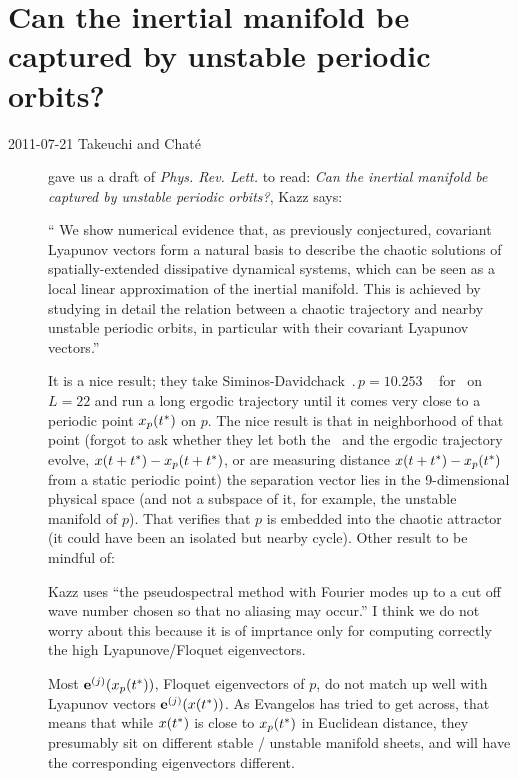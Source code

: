 \RemarksEnd

\section{Can the inertial manifold be captured by unstable periodic orbits?}
\label{sec:TaCh11}

\begin{description}

\item[2011-07-21 Takeuchi and Chat\'e]
gave us a draft of \emph{Phys. Rev. Lett.} to read:
\emph{Can the inertial manifold be captured by unstable periodic orbits?},
Kazz says:

`` We show numerical evidence that, as previously conjectured,
covariant Lyapunov vectors form a natural basis to describe the
chaotic solutions of spatially-extended dissipative dynamical
systems, which can be seen as a local linear approximation of the
inertial manifold. This is achieved by studying in detail the
relation between a chaotic trajectory and nearby unstable periodic
orbits, in particular with their covariant Lyapunov vectors.''

It is a nice result; they take Siminos-Davidchack $\period{p} = 10.253$
\po\  for \KS\ on $L = 22$ and run a long ergodic trajectory until it
comes very close to a periodic point $\ssp_p(t^*) $ on $p$. The nice
result is that in neighborhood of that point (forgot to ask whether they
let both the \po\ and the ergodic trajectory evolve, $\ssp(t+t^*) -
\ssp_p(t+t^*)$, or are measuring distance $\ssp(t+t^*) - \ssp_p(t^*)$ from a
static periodic point) the separation vector lies in the 9-dimensional
physical space (and not a subspace of it, for example, the unstable
manifold of $p$). That verifies that $p$ is embedded into the chaotic
attractor (it could have been an isolated but nearby cycle).
Other result to be mindful of:

Kazz uses ``the pseudospectral method with Fourier modes up to a cut off
wave number chosen so that no aliasing may occur.'' I think we do not
worry about this because it is of imprtance only for computing correctly
the high Lyapunove/Floquet eigenvectors.

Most $\jEigvec[j](\ssp_p(t^*))$, Floquet eigenvectors of $p$, do not match
up well with Lyapunov vectors $\jEigvec[j](\ssp(t^*))$. As Evangelos has
tried to get across, that means that while $\ssp(t^*)$ is close to
$\ssp_p(t^*) $ in Euclidean distance, they presumably sit on different
stable / unstable manifold sheets, and will have the corresponding
eigenvectors different.


\end{description}
